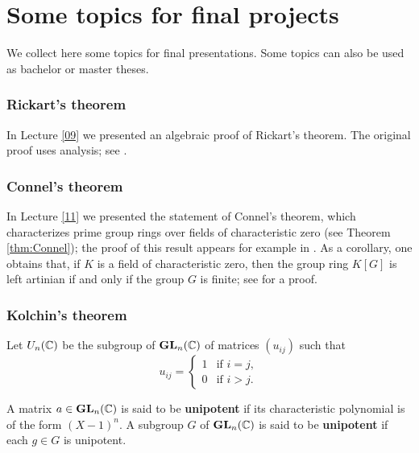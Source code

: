 \chapter*{Some topics for final projects}

\pagestyle{plain}
\fancyhf{}
\fancyfoot[CE,CO]{\leftmark}
\fancyfoot[LE,RO]{\thepage}


We collect here some topics for final presentations. Some topics
can also be used as bachelor or master theses. 

\subsection*{Rickart's theorem}

In Lecture \ref{09} we presented an algebraic proof of Rickart's theorem. 
The original proof uses analysis; see \cite[(6.4) of Chapter II]{MR1838439}. 

\subsection*{Connel's theorem}

In Lecture \ref{11} we presented the statement of Connel's theorem, which
characterizes prime group rings over fields of characteristic zero 
(see Theorem \ref{thm:Connel}); the proof of this  
result appears for example in \cite[Theorem 2.10 of Chapter 4]{MR798076}. 
As a corollary, one obtains 
that, if $K$ is a field of characteristic zero,
then the group ring $K[G]$ is left artinian if and only if the group
$G$ is finite; see 
\cite[Theorem 1.1 of Chapter 10]{MR798076} for a proof. 

\subsection*{Kolchin's theorem}

Let $U_n(\mathbb{C})$ be the subgroup of $\mathbf{GL}_n(\mathbb{C})$ 
of matrices $(u_{ij})$ such that 
\[
u_{ij}=\begin{cases}
1&\text{if $i=j$},\\
0&\text{if $i>j$}.\end{cases}
\]

A matrix $a\in\mathbf{GL}_n(\mathbb{C})$ is said to be \textbf{unipotent} 
if its characteristic polynomial is of the form $(X-1)^n$. 
A subgroup $G$ of $\mathbf{GL}_n(\mathbb{C})$ is said to be \textbf{unipotent} if
each $g\in G$ is unipotent. 

